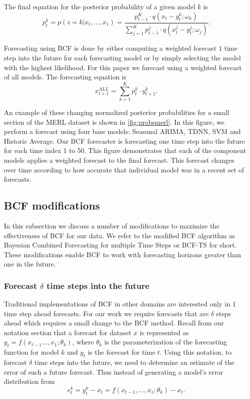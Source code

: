 The final equation for the posterior probability of a given model $k$ is
\begin{equation}
\label{eq:model_prob}
p_{t}^{k} = p(z = k|x_{t}, ..., x_{1}) = \frac{p_{t - 1}^{K} \cdot q(x_{t} - y_{t}^{k}; \omega_{k})}{\sum_{j=1}^{K}p_{t - 1}^{j} \cdot q(x_{t}^{j} - y_{t}^{j}; \omega_{j})}.
\end{equation}

Forecasting using BCF is done by either computing a weighted forecast $1$ time step into the future for each forecasting model or by simply selecting the model with the highest likelihood.  For this paper we forecast using a weighted forecast of all models.  The forecasting equation is
\begin{equation}
x_{t + 1}^{ALL} = \sum_{k=1}^{K}p_{t}^{k} \cdot y_{t + 1}^{k}.
\end{equation}

An example of these changing normalized posterior probabilities for a small section of the MERL dataset is shown in \ref{fig:probsmerl}.  In this figure, we perform a forecast using four base models: Seasonal ARIMA, TDNN, SVM and Historic Average.  Our BCF forecaster is forecasting one time step into the future for each time index 1 to 50.  This figure demonstrates that each of the component models applies a weighted forecast to the final forecast.  This forecast changes over time according to how accurate that individual model was in a recent set of forecasts.


\subsection{BCF modifications}
In this subsection we discuss a number of modifications to maximize the effectiveness of BCF for our data.  We refer to the modified BCF algorithm as Bayesian Combined Forecasting for multiple Time Steps or BCF-TS for short.  These modifications  enable BCF to work with forecasting horizons greater than one in the future.

\subsubsection{Forecast $\delta$ time steps into the future}
Traditional implementations of BCF in other domains \cite{Petridis2001, Zheng2006} are interested only in 1 time step ahead forecasts.  For our work we require forecasts that are $\delta$ steps ahead which requires a small change to the BCF method.  Recall from our notation section that a forecast for dataset $x$ is represented as $y_{t} = f(x_{t - 1} ..., x_{1}; \theta_{k})$, where $\theta_{k}$ is the parameterization of the forecasting function for model $k$ and $y_{t}$ is the forecast for time $t$.  Using this notation, to forecast $\delta$ time steps into the future, we need to determine an estimate of the error of such a future forecast.  Thus instead of generating a model's error distribution from 
\begin{equation}
e_{t}^{k} = y_{t}^{k} - x_{t} = f(x_{t - 1}, ..., x_{1}; \theta_{k}) - x_{t}.
\end{equation}


